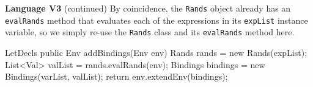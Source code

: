 \begin{minipage}[t]{\sw}
\slidenumber
\LARGE
{\bf Language V3} (continued)\exx
By coincidence, the \verb'Rands' object
already has an \verb'evalRands' method
that evaluates each of the expressions
in its \verb'expList' instance variable,
so we simply re-use the \verb'Rands' class
and its \verb'evalRands' method here.
{\Large
\begin{qv}
LetDecls
    public Env addBindings(Env env) {
        Rands rands = new Rands(expList);
        List<Val> valList = rands.evalRands(env);
        Bindings bindings = new Bindings(varList, valList);
        return env.extendEnv(bindings);
    }
\end{qv}
}
\end{minipage}
\clearpage
